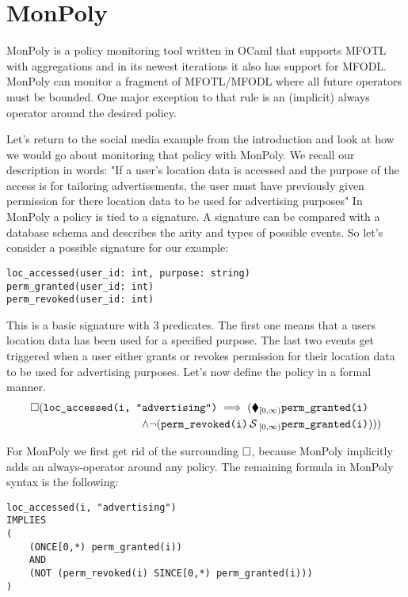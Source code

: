 \section{MonPoly}
MonPoly \cite{Basin2017} is a policy monitoring tool written in OCaml that supports MFOTL with aggregations and in its newest iterations it also has support for MFODL.
MonPoly can monitor a fragment of MFOTL/MFODL where all future operators must be bounded.
One major exception to that rule is an (implicit) always operator around the desired policy.

Let's return to the social media example from the introduction and look at how we would go about monitoring that policy with MonPoly.
We recall our description in words:
    "If a user's location data is accessed and the purpose of the access is for tailoring advertisements, the user must have previously given permission for there location data to be used for advertising purposes"
In MonPoly a policy is tied to a signature.
A signature can be compared with a database schema and describes the arity and types of possible events.
So let's consider a possible signature for our example: 

\begin{verbatim}
loc_accessed(user_id: int, purpose: string)
perm_granted(user_id: int)
perm_revoked(user_id: int)
\end{verbatim}

This is a basic signature with 3 predicates.
The first one means that a users location data has been used for a specified purpose.
The last two events get triggered when a user either grants or revokes permission for their location data to be used for advertising purposes.
Let's now define the policy in a formal manner.
\begin{align*}
    \square (\texttt{loc\_accessed(i, "advertising")}
    \implies (\blacklozenge_{[0,\infty)} &\texttt{perm\_granted(i)} \\
         \land  \neg (\texttt{perm\_revoked(i)} \,\mathcal{S}\,_{[0,\infty)} 
            &\texttt{perm\_granted(i)})))
\end{align*}

For MonPoly we first get rid of the surrounding $\square$, because MonPoly implicitly adds an always-operator around any policy.
The remaining formula in MonPoly syntax is the following:

\begin{verbatim}
loc_accessed(i, "advertising")
IMPLIES 
(
    (ONCE[0,*) perm_granted(i)) 
    AND 
    (NOT (perm_revoked(i) SINCE[0,*) perm_granted(i)))
)
\end{verbatim}

